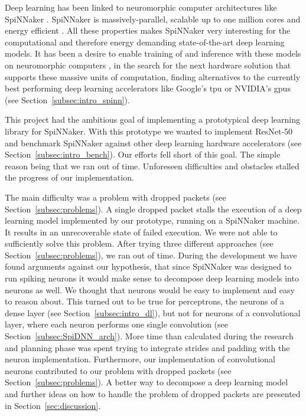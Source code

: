 \documentclass[]{article}
\begin{document}
Deep learning has been linked to neuromorphic computer architectures
like SpiNNaker \citep{gomes_2017}.
SpiNNaker is massively-parallel, scalable up to one million cores
and energy efficient \citep{furber_et_al_2020}.
All these properties makes SpiNNaker very interesting for the
computational and therefore energy demanding state-of-the-art deep
learning models.
It has been a desire to enable training of and inference with these
models on neuromorphic computers \citep{gomes_2017}, in the search for
the next hardware solution that supports these massive units of
computation, finding alternatives to the currently best performing
deep learning accelerators like Google's \acrshort{tpu} or NVIDIA's
\acrshort{gpu}s (see Section~\ref{subsec:intro_spinn}).

This project had the ambitious goal of implementing a prototypical
deep learning library for SpiNNaker.
With this prototype we wanted to implement ResNet-50 and benchmark
SpiNNaker against other deep learning hardware accelerators
(see Section~\ref{subsec:intro_bench}).
Our efforts fell short of this goal.
The simple reason being that we ran out of time.
Unforeseen difficulties and obstacles stalled the progress of
our implementation.

The main difficulty was a problem with dropped packets (see
Section~\ref{subsec:problems}).
A single dropped packet stalls the execution of a deep learning model
implemented by our prototype, running on a SpiNNaker machine.
It results in an unrecoverable state of failed execution.
We were not able to sufficiently solve this problem.
After trying three different approaches (see
Section~\ref{subsec:problems}), we ran out of time.
During the development we have found arguments against our hypothesis,
that since SpiNNaker was designed to run spiking neurons it would make
sense to decompose deep learning models into neurons as well.
We thought that neurons would be easy to implement and easy to reason
about.
This turned out to be true for perceptrons, the neurons of a dense
layer (see Section~\ref{subsec:intro_dl}), but not for neurons of
a convolutional layer, where each neuron performs one single
convolution (see Section~\ref{subsec:SpiDNN_arch}).
More time than calculated during the research and planning phase was
spent trying to integrate strides and padding with the neuron
implementation.
Furthermore, our implementation of convolutional neurons contributed
to our problem with dropped packets (see
Section~\ref{subsec:problems}).
A better way to decompose a deep learning model and further ideas on
how to handle the problem of dropped packets are presented in
Section~\ref{sec:discussion}.
\end{document}

